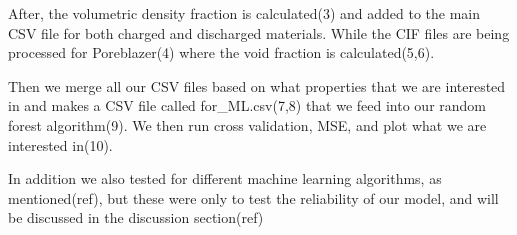 After, the volumetric density fraction is calculated(3) and added to the main CSV file for both charged and discharged materials. While the CIF files are being processed for Poreblazer(4) where the void fraction is calculated(5,6). 

Then we merge all our CSV files based on what properties that we are interested in and makes a CSV file called for\_ML.csv(7,8) that we feed into our random forest algorithm(9). We then run cross validation, MSE, and plot what we are interested in(10).

In addition we also tested for different machine learning algorithms, as mentioned(ref), but these were only to test the reliability of our model, and will be discussed in the discussion section(ref) 





\begin{comment}
\myworries{This is in the intro.}
The original plan was to make a model that could predict Ionic conductivity for potential solid state electrolytes but after gathering and searching for information we found this article (REF:) by Sendek: Were they could not find a sufficient amount of data on ionic conductivity for a proper model to be created, or rather, they only found 40 materials that they used to make their prediction on ionic conductivity, something that our group deemed far to little for a proper prediction, even if we added the $ 40$ that we found from our own search. 

We then tried to use the materialsproject's database (MPDB), which resulted in a change of focus from electrolytes to electrodes, due to the nature of that database and ML's demand for as much relevant data as possible.

The MPDB included much information on electrodes that came to good use. First and foremost an organized list over reduction cell formulas, CIF files and Voltage pair properties, including, but not limited to; Energy above hull as an indicator of stability, Volume change of the battery, Capacity, both gravimetric and volumetric, and Voltage - of the specific pair. All of these are of interest to our model both as predictors and targets. 

We wrote a highly versatile code that can easily run a random forest algorithm on whatever we deem fit as a target with what predictors to use. (see section; 'Random forest')

From the CIF files we calculated the number density\myworries{ref?}, for both the charged and discharged - materials, which is the number of one particular atom in the unit cell and dividing it by the volume of the unit cell so that we could feed our machine with something that represented the density in a meaningful way, in the case that the machine would find any correlation between this and any of the chosen targets. Which it did. 
\end{comment}


